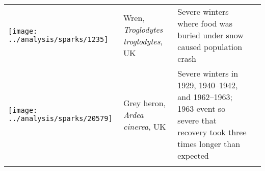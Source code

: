 \begin{small}
\begin{longtable}{>{\RaggedRight}m{2.0cm}>{\RaggedRight}p{3.0cm}>{\RaggedRight}p{7.0cm}>{\RaggedRight}p{2.0cm}}
\texttt{[image: ../analysis/sparks/1235]} &
Wren,
\textit{Troglodytes troglodytes},
UK &
Severe winters where food was buried under snow caused population crash &
\citep{newton1998} \\

\texttt{[image: ../analysis/sparks/20579]} &
Grey heron,
\textit{Ardea cinerea},
UK &
Severe winters in 1929, 1940--1942, and 1962--1963; 1963 event so severe that
recovery took three times longer than expected &
\citep{stafford1971} \\





\bottomrule
\label{tab:sparks}
\end{longtable}
\end{small}

